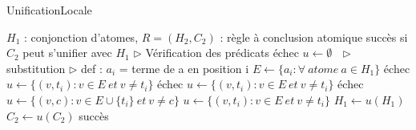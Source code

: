 \begin{center}
\begin{algorithm}[H]
\caption{UnificationLocale}\label{unification_locale}
\begin{algorithmic}[1]
\REQUIRE $H_{1}$ : conjonction d'atomes, $R = (H_{2},C_{2})$ : r\`egle \`a conclusion atomique 
\ENSURE succ\`es si $C_{2}$ peut s'unifier avec $H_{1}$ 
\STATE $\triangleright$ V\'erification des pr\'edicats
		\RETURN \'echec
	\ENDIF
\ENDFOR
\STATE $u \leftarrow \emptyset\ \ \ \triangleright$ substitution 
	\STATE $\triangleright$ def : $a_{i}$ = terme de a en position i
	\STATE $E \leftarrow \{a_{i} : \forall\ atome\ a \in H_{1}\}$
			\RETURN \'echec
		\ELSE
			\STATE $u \leftarrow \{(v,t_{i}) : v \in E\ et\ v \neq t_{i}\}$
		\ENDIF
			\RETURN \'echec
		\ELSE
			\STATE $u \leftarrow \{(v,t_{i}) : v \in E\ et\ v \neq t_{i}\}$
		\ENDIF
	\ELSE
			\RETURN \'echec
			\STATE $u \leftarrow \{(v,c) : v \in E \cup \{t_{i}\}\ et\ v \neq c\}$
		\ELSE
			\STATE $u \leftarrow \{(v,t_{i}) : v \in E\ et\ v \neq t_{i}\}$
		\ENDIF
	\ENDIF	
	\STATE $H_{1} \leftarrow u(H_{1})$
	\STATE $C_{2} \leftarrow u(C_{2})$
\ENDFOR
\RETURN succ\`es 

\end{algorithmic}
\end{algorithm}
\end{center}


